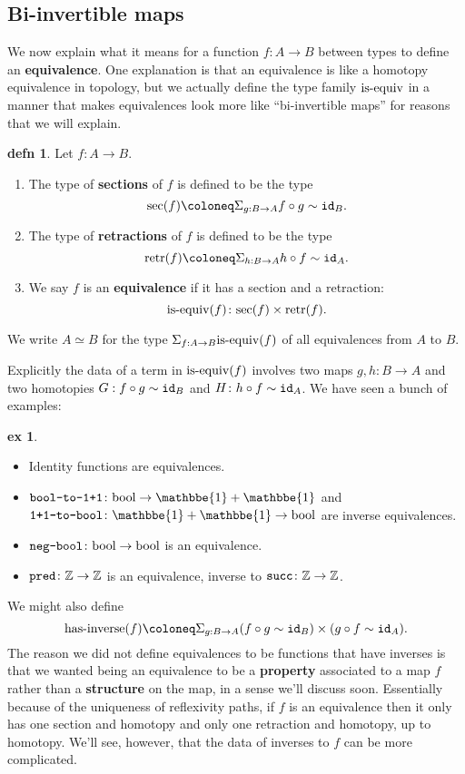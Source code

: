 \documentclass{amsart}
\theoremstyle{theorem}
\theoremstyle{definition}
\newtheorem*{defn}{defn}
\newtheorem*{ex}{ex}
\theoremstyle{remark}
\newcommand{\0}{\mathbbe{0}}
\newcommand{\1}{\mathbbe{1}}
\newcommand{\2}{\mathbbe{2}}
\newcommand{\3}{\mathbbe{3}}
\newcommand{\4}{\mathbbe{4}}
\newcommand{\term}[1]{{\textup{\texttt{#1}}}}
\newcommand{\type}[1]{{\textup{#1}}}
\newcommand{\id}{\term{id}}
\newcommand{\bZ}{{\mathbb{Z}}}
\newcommand{\bool}{\type{bool}}
\begin{document}
\subsection*{Bi-invertible maps}

We now explain what it means for a function $f \colon A \to B$ between types to define an \textbf{equivalence}. One explanation is that an equivalence is like a homotopy equivalence in topology, but we actually define the type family $\type{is-equiv}$ in a manner that makes equivalences look more like ``bi-invertible maps'' for reasons that we will explain.

\begin{defn} Let $f \colon A \to B$. 
\begin{enumerate}
\item The type of \textbf{sections} of $f$ is defined to be the type
\[ \type{sec}(f) \coloneq \Sigma_{g : B \to A} f\circ g \sim \id_B.\]
\item The type of \textbf{retractions} of $f$ is defined to be the type
\[ \type{retr}(f) \coloneq \Sigma_{h : B \to A} h \circ f \sim \id_A.\]
\item We say $f$ is an \textbf{equivalence} if it has a section and a retraction:
\[ \type{is-equiv}(f) \colon \type{sec}(f) \times \type{retr}(f).\]
\end{enumerate}
We write $A \simeq B$ for the type $\Sigma_{f : A \to B} \type{is-equiv}(f)$ of all equivalences from $A$ to $B$.
\end{defn}

Explicitly the data of a term in $\type{is-equiv}(f)$ involves two maps $g, h : B \to A$ and two homotopies $G : f \circ g \sim \id_B$ and $H \colon h \circ f \sim \id_A$. We have seen a bunch of examples:

\begin{ex} $\quad$
\begin{itemize}
\item Identity functions are equivalences.
\item $\term{bool-to-1+1} \colon \bool \to \1+\1$ and $\term{1+1-to-bool} \colon \1+\1 \to \bool$ are inverse equivalences.
\item $\term{neg-bool} \colon \bool \to \bool$ is an equivalence.
\item $\term{pred} \colon \bZ \to \bZ$ is an equivalence, inverse to $\term{succ} \colon \bZ \to \bZ$.
\end{itemize}
\end{ex}

We might also define
\[ \type{has-inverse}(f) \coloneq \Sigma_{g : B \to A} (f \circ g \sim \id_B) \times (g \circ f \sim \id_A).\]
The reason we did not define equivalences to be functions that have inverses is that we wanted being an equivalence to be a \textbf{property} associated to a map $f$ rather than a \textbf{structure} on the map, in a sense we'll discuss soon. Essentially because of the uniqueness of reflexivity paths, if $f$ is an equivalence then it only has one section and homotopy and only one retraction and homotopy, up to homotopy. We'll see, however, that the data of inverses to $f$ can be more complicated.
\end{document}

